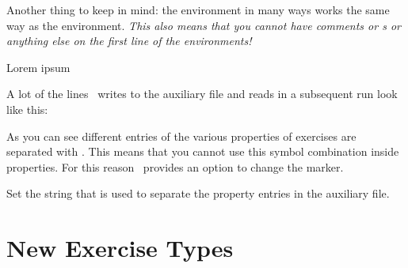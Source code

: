 \documentclass{xsim-manual}
\begin{document}
\begin{bewareofthedog}
  Another thing to keep in mind: the environment in many ways works the same
  way as the  environment. \emph{This also means that you
    \emph{cannot} have comments or s or anything else on the first
    line of the environments!}
\end{bewareofthedog}
\begin{sourcecode}
  \begin{exercise}[points=2] %
    Lorem ipsum
  \end{exercise}
\end{sourcecode}

\begin{bewareofthedog}
  \xsimauxfileinfo
\end{bewareofthedog}

\begin{bewareofthedog}
  A lot of the lines \xsim\ writes to the auxiliary file and reads in a
  subsequent run look like this:
\begin{sourcecode}
\end{sourcecode}
  As you can see different entries of the various properties of exercises are
  separated with \code{||}.  This means that you cannot use this symbol
  combination inside properties.  For this reason \xsim\ provides an option to
  change the marker.
\end{bewareofthedog}
\begin{options}
  \Default{\code{||}}
    Set the string that is used to separate the property
    entries in the auxiliary file.
\end{options}

\section{New Exercise Types}\label{sec:new-exercise-types}
\end{document}
